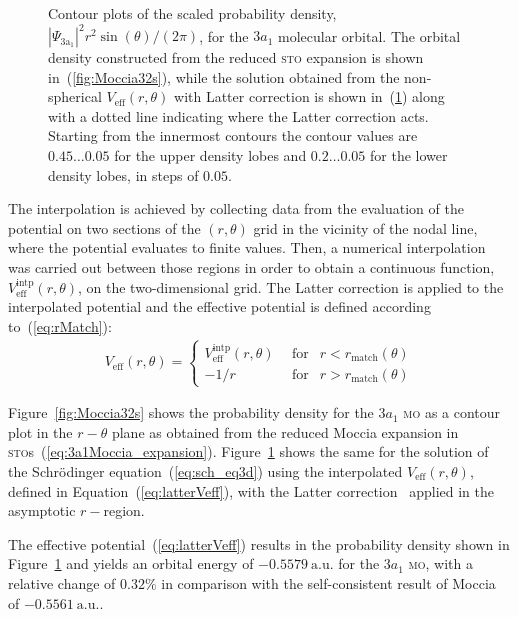 \begin{figure}
\begin{subfigure}[b]{0.275\linewidth}
    \caption{}\label{fig:intp32s}
  \end{subfigure}
  \caption{Contour plots of the scaled probability density,
    $|\Psi_{\mathrm{3a_{1}}}|^{2}r^{2}\sin(\theta)/(2\pi)$, for the
    $3a_{1}$ molecular orbital. The orbital density constructed from
    the reduced \textsc{sto} expansion is shown
    in~(\ref{fig:Moccia32s}), while the solution obtained from the
    non-spherical $V_{\mathrm{eff}}(r,\theta)$ with Latter correction
    is shown in~(\ref{fig:intp32s}) along with a dotted line
    indicating where the Latter correction acts. Starting from the
    innermost contours the contour values are $0.45\dots 0.05$ for the
    upper density lobes and $0.2\dots 0.05$ for the lower density
    lobes, in steps of $0.05$.}
  \label{fig:density_contours}
\end{figure}

The interpolation is achieved by collecting data from the evaluation
of the potential on two sections of the $(r,\theta)$ grid in the
vicinity of the nodal line, where the potential evaluates to finite
values. Then, a numerical interpolation was carried out between those
regions in order to obtain a continuous function,
$V_{\mathrm{eff}}^{\mathrm{intp}}(r,\theta)$, on the two-dimensional
grid. The Latter correction is applied to the interpolated potential
and the effective potential is defined according to~(\ref{eq:rMatch}):
%
\begin{eqnarray}
  V_{\mathrm{eff}}(r,\theta) = \left\{
  \begin{split}
    V_{\mathrm{eff}}^{\mathrm{intp}}(r,\theta)\
    & \mathrm{~for} & r < r_{\mathrm{match}}(\theta) \\
    -1/r\ & \mathrm{~for} &  r > r_{\mathrm{match}}(\theta)
  \end{split}
\right.
\label{eq:latterVeff}
\end{eqnarray}
%

Figure~\ref{fig:Moccia32s} shows the probability density for the
$3a_{1}$ \textsc{mo} as a contour plot in the $r-\theta$ plane as
obtained from the reduced Moccia expansion in
\textsc{sto}s~(\ref{eq:3a1Moccia_expansion}). Figure~\ref{fig:intp32s}
shows the same for the solution of the Schr\"{o}dinger
equation~(\ref{eq:sch_eq3d}) using the interpolated
$V_{\mathrm{eff}}(r,\theta)$, defined in
Equation~(\ref{eq:latterVeff}), with the Latter
correction~\cite{LatterCor_1955} applied in the asymptotic $r-$region.

The effective potential~(\ref{eq:latterVeff}) results in the
probability density shown in Figure~\ref{fig:intp32s} and yields an
orbital energy of $-0.5579\ \mathrm{a.u.}$ for the $3a_{1}$
\textsc{mo}, with a relative change of $0.32\%$ in comparison with the
self-consistent result of Moccia~\cite{Moccia_1964} of
$-0.5561\ \mathrm{a.u.}$.

